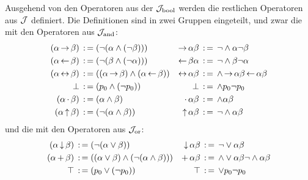 Ausgehend von den Operatoren aus der  $\mathcal{J}_{\mathrm{bool}}$ werden die restlichen Operatoren aus $\mathcal{J}$ definiert. Die Definitionen sind in zwei Gruppen eingeteilt, und zwar die mit den Operatoren aus $\mathcal{J}_{\mathrm{and}}$:
\begin{align}
	(\alpha \operatorname{\rightarrow} \beta) &\;\operatorname{:=}\; (\lnot (\alpha \land  (\lnot \beta))) &
	\operatorname{\rightarrow} \alpha \beta   &\;\operatorname{:=}\;  \lnot    \land \alpha \lnot \beta
	\label{def:imp}
	\\
	(\alpha \operatorname{\leftarrow} \beta) &\;\operatorname{:=}\; (\lnot (\beta \land  (\lnot \alpha))) &
	\operatorname{\leftarrow} \beta  \alpha  &\;\operatorname{:=}\;  \lnot    \land \beta \lnot \alpha
	\label{def:rep}
	\\
	(\alpha\operatorname{\leftrightarrow}\beta) &\;\operatorname{:=}\;((\alpha\operatorname{\rightarrow}\beta)\land(\alpha\operatorname{\leftarrow}\beta))&
	\operatorname{\leftrightarrow}\alpha \beta  &\;\operatorname{:=}\;\land \operatorname{\rightarrow} \alpha \beta \operatorname{\leftarrow} \alpha \beta
	\label{def:equiv}
	\\
	\bot              &\;\operatorname{:=}\; (p_0 \land    (\lnot p_0))    &
	\bot              &\;\operatorname{:=}\;      \land p_0 \lnot p_0   \label{def:false}
	\\
	(\alpha \operatorname{\cdot} \beta)&\;\operatorname{:=}\; (\alpha \land \beta)          &
	\operatorname{\cdot} \alpha  \beta &\;\operatorname{:=}\;  \land \alpha \beta        \label{def:mult}
	\\
	(\alpha \operatorname{\uparrow} \beta)&\;\operatorname{:=}\; (\lnot (\alpha \land \beta )) &
	\operatorname{\uparrow} \alpha  \beta &\;\operatorname{:=}\;  \lnot  \land \alpha \beta \label{def:nand}
\end{align}
und die mit den Operatoren aus $\mathcal{J}_{\mathrm{or}}$:
\begin{align}
	(\alpha \operatorname{\downarrow} \beta) &\;\operatorname{:=}\; (\lnot (\alpha \lor \beta))   &
	\operatorname{\downarrow} \alpha  \beta  & \;\operatorname{:=}\;  \lnot  \lor \alpha \beta \label{def:nor}
	\\
	(\alpha\operatorname{+}\beta)&\;\operatorname{:=}\;((\alpha\lor\beta)\land(\lnot(\alpha\land\beta)))&
	\operatorname{+}\alpha \beta &\;\operatorname{:=}\;  \land \lor\alpha\beta \lnot \land\alpha\beta
	\label{def:add}
	\\
	\top & \;\operatorname{:=}\; (p_0 \lor    (\lnot p_0)) &
	\top & \;\operatorname{:=}\;      \lor p_0 \lnot p_0
	\label{def:true}
\end{align}

